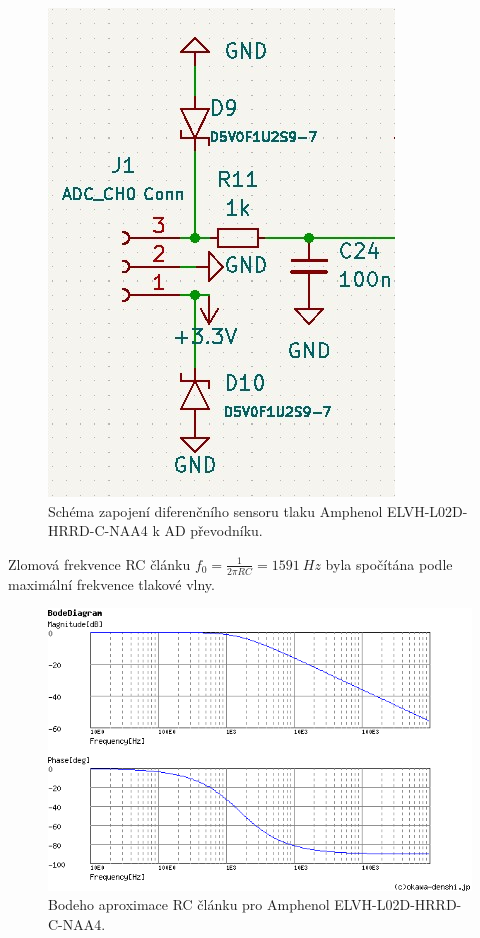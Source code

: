 \begin{figure}[H]
    \centering
    \includegraphics[width=0.7\linewidth]{pictures/diff_sen_circuit.jpg}
    \caption{Schéma zapojení diferenčního sensoru tlaku Amphenol ELVH-L02D-HRRD-C-NAA4 k AD převodníku.}
    \label{fig:amphenol_circuit}
\end{figure}

\raggedbottom
Zlomová frekvence RC článku $f_0 = \frac{1}{2 \pi RC} = 1591 \ Hz $ byla spočítána podle maximální frekvence tlakové vlny.

\begin{figure}[H]
    \centering
    \includegraphics[width=0.9\linewidth]{pictures/rc_1k_100n_1591.png}
    \caption{Bodeho aproximace RC článku pro Amphenol ELVH-L02D-HRRD-C-NAA4. \cite{cite:RCResponse}}
    \label{fig:amphenol_filter}
\end{figure}

